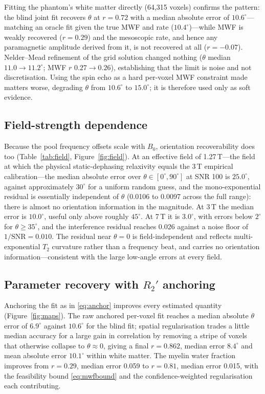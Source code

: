 \documentclass[AMA,STIX2COL,Linenumberson]{MRM}
\begin{document}
Fitting the phantom's white matter directly (64,315 voxels) confirms the pattern: the blind joint fit recovers $\theta$ at $r=0.72$ with a median absolute error of $10.6^\circ$---matching an oracle fit given the true MWF and rate ($10.4^\circ$)---while MWF is weakly recovered ($r=0.29$) and the mesoscopic rate, and hence any paramagnetic amplitude derived from it, is not recovered at all ($r=-0.07$). Nelder--Mead refinement of the grid solution changed nothing ($\theta$ median $11.0\to11.2^\circ$; MWF $r$ $0.27\to0.26$), establishing that the limit is noise and not discretisation. Using the spin echo as a hard per-voxel MWF constraint made matters worse, degrading $\theta$ from $10.6^\circ$ to $15.0^\circ$; it is therefore used only as soft evidence.

\subsection{Field-strength dependence}
\label{sec:res-field}

Because the pool frequency offsets scale with $B_0$, orientation recoverability does too (Table~\ref{tab:field}, Figure~\ref{fig:field}). At an effective field of 1.27\,T---the field at which the physical static-dephasing relaxivity equals the 3\,T empirical calibration---the median absolute error over $\theta\in[0^\circ,90^\circ]$ at SNR 100 is $25.0^\circ$, against approximately $30^\circ$ for a uniform random guess, and the mono-exponential residual is essentially independent of $\theta$ (0.0106 to 0.0097 across the full range): there is almost no orientation information in the magnitude. At 3\,T the median error is $10.0^\circ$, useful only above roughly $45^\circ$. At 7\,T it is $3.0^\circ$, with errors below $2^\circ$ for $\theta\ge35^\circ$, and the interference residual reaches 0.026 against a noise floor of $1/\mathrm{SNR}=0.010$. The residual near $\theta=0$ is field-independent and reflects multi-exponential $T_2$ curvature rather than a frequency beat, and carries no orientation information---consistent with the large low-angle errors at every field.

\subsection{Parameter recovery with $R_2'$ anchoring}
\label{sec:res-params}

Anchoring the fit as in \eqref{eq:anchor} improves every estimated quantity (Figure~\ref{fig:maps}). The raw anchored per-voxel fit reaches a median absolute $\theta$ error of $6.9^\circ$ against $10.6^\circ$ for the blind fit; spatial regularisation trades a little median accuracy for a large gain in correlation by removing a stripe of voxels that otherwise collapse to $\theta\approx0$, giving a final $r=0.862$, median error $8.4^\circ$ and mean absolute error $10.1^\circ$ within white matter. The myelin water fraction improves from $r=0.29$, median error 0.059 to $r=0.81$, median error 0.015, with the feasibility bound \eqref{eq:mwfbound} and the confidence-weighted regularisation each contributing.
\end{document}

